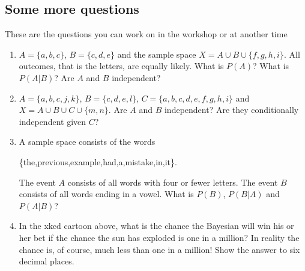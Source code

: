 \documentclass[11pt,a4paper]{scrartcl}
\begin{document}
\subsection*{Some more questions}

These are the questions you can work on in the workshop or at another time

\begin{enumerate}

\item $A=\{a,b,c\}$, $B=\{c,d,e\}$ and the sample space $X=A\cup B\cup \{f,g,h,i\}$. All outcomes, that is the letters, are equally likely. What is $P(A)$? What is $P(A|B)$? Are $A$ and $B$ independent?

\item $A=\{a,b,c,j,k\}$, $B=\{c,d,e,l\}$, $C=\{a,b,c,d,e,f,g,h,i\}$ and $X=A\cup B\cup C\cup \{m,n\}$. Are $A$ and $B$ independent? Are they conditionally independent given $C$?

\item A sample space consists of the words
\begin{center}
  \{the,previous,example,had,a,mistake,in,it\}.
  \end{center}
The event $A$ consists of all words with four or fewer letters. The event $B$ consists of all words ending in a vowel. What is $P(B)$, $P(B|A)$ and $P(A|B)$?


\item In the xkcd cartoon above, what is the chance the Bayesian will
  win his or her bet if the chance the sun has exploded is one in a
  million? In reality the chance is, of course, much less than one in
  a million! Show the answer to six decimal places.
  
\end{enumerate}
\end{document}
